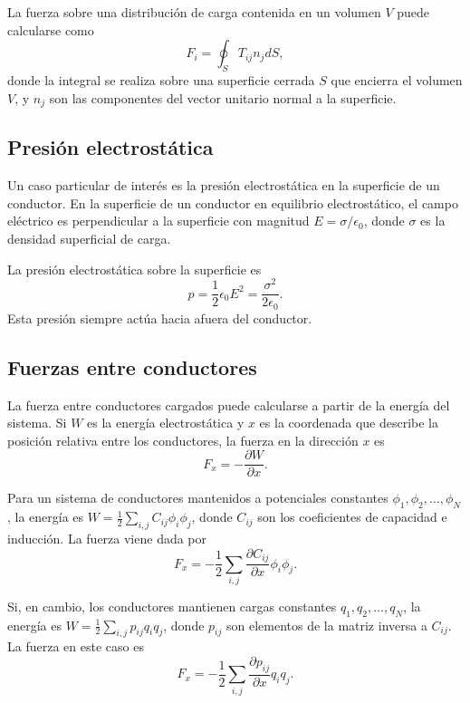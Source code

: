 \documentclass[12pt,a4paper]{book}
\begin{document}
La fuerza sobre una distribución de carga contenida en un volumen $V$ puede calcularse como
\begin{equation}
F_i = \oint_S T_{ij} n_j dS,
\end{equation}
donde la integral se realiza sobre una superficie cerrada $S$ que encierra el volumen $V$, y $n_j$ son las componentes del vector unitario normal a la superficie.

\subsection{Presión electrostática}

Un caso particular de interés es la presión electrostática en la superficie de un conductor. En la superficie de un conductor en equilibrio electrostático, el campo eléctrico es perpendicular a la superficie con magnitud $E = \sigma/\epsilon_0$, donde $\sigma$ es la densidad superficial de carga.

La presión electrostática sobre la superficie es
\begin{equation}
p = \frac{1}{2} \epsilon_0 E^2 = \frac{\sigma^2}{2\epsilon_0}.
\end{equation}
Esta presión siempre actúa hacia afuera del conductor.

\subsection{Fuerzas entre conductores}

La fuerza entre conductores cargados puede calcularse a partir de la energía del sistema. Si $W$ es la energía electrostática y $x$ es la coordenada que describe la posición relativa entre los conductores, la fuerza en la dirección $x$ es
\begin{equation}
F_x = -\frac{\partial W}{\partial x}.
\end{equation}

Para un sistema de conductores mantenidos a potenciales constantes $\phi_1, \phi_2, \ldots, \phi_N$, la energía es $W = \frac{1}{2} \sum_{i,j} C_{ij}\phi_i\phi_j$, donde $C_{ij}$ son los coeficientes de capacidad e inducción. La fuerza viene dada por
\begin{equation}
F_x = -\frac{1}{2} \sum_{i,j} \frac{\partial C_{ij}}{\partial x}\phi_i\phi_j.
\end{equation}

Si, en cambio, los conductores mantienen cargas constantes $q_1, q_2, \ldots, q_N$, la energía es $W = \frac{1}{2} \sum_{i,j} p_{ij}q_i q_j$, donde $p_{ij}$ son elementos de la matriz inversa a $C_{ij}$. La fuerza en este caso es
\begin{equation}
F_x = -\frac{1}{2} \sum_{i,j} \frac{\partial p_{ij}}{\partial x}q_i q_j.
\end{equation}
\end{document}
